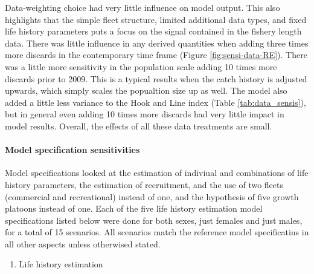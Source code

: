 \documentclass[11pt,
  english,
  a4paper,
]{article}
\begin{document}
\leavevmode\tagmcend\tagstructend\par


Data-weighting choice had very little influence on model output. This also highlights that the simple fleet structure, limited additional data types, and fixed life history parameters puts a focus on the signal contained in the fishery length data. There was little influence in any derived quantities when adding three times more discards in the contemporary time frame (Figure \ref{fig:sensi-data-RE}). There was a little more sensitivity in the population scale adding 10 times more discards prior to 2009. This is a typical results when the catch history is adjusted upwards, which simply scales the popualtion size up as well. The model also added a little less variance to the Hook and Line index (Table \ref{tab:data_sensis}), but in general even adding 10 times more discards had very little impact in model results. Overall, the effects of all these data treatments are small.

\leavevmode\tagmcend\tagstructend\par


\hypertarget{model-specification-sensitivities}{%
\paragraph{Model specification sensitivities}\label{model-specification-sensitivities}}

\leavevmode\tagmcend\tagstructend


Model specifications looked at the estimation of indiviual and combinations of life history parameters, the estimation of recruitment, and the use of two fleets (commercial and recreational) instead of one, and the hypothesis of five growth platoons instead of one. Each of the five life history estimation model specifications listed below were done for both sexes, just females and just males, for a total of 15 scenarios. All scenarios match the reference model specificatins in all other aspects unless otherwised stated.

\leavevmode\tagmcend\tagstructend\par


\begin{enumerate}
\def\labelenumi{\arabic{enumi}.}
\item

  Life history estimation

  \tagmcend\tagstructend\tagstructend
\end{enumerate}
\end{document}
